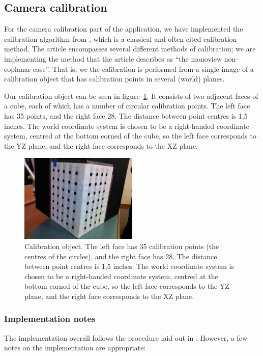 \subsection{Camera calibration}
For the camera calibration part of the application, we have
implemented the calibration algorithm from \cite{TSAI}, which is a
classical and often cited calibration method. The article encompasses
several different methods of calibration; we are implementing the
method that the article describes as ``the monoview non-coplanar
case''. That is, we the calibration is performed from a single image
of a calibration object that has calibration points in several (world)
planes.

Our calibration object can be seen in figure~\ref{fig:calib-object}.
It consists of two adjacent faces of a cube, each of which has a
number of circular calibration points. The left face has 35 points,
and the right face 28. The distance between point centres is 1,5
inches. The world coordinate system is chosen to be a right-handed
coordinate system, centred at the bottom corned of the cube, so the
left face corresponds to the YZ plane, and the right face corresponds
to the XZ plane.

\begin{figure}[HBO]
  \centering
  \includegraphics[width=0.5\textwidth]{figures/calibration-object}
  \caption{Calibration object. The left face has 35 calibration points
    (the centres of the circles), and the right face has 28. The
    distance between point centres is 1,5 inches. The world coordinate
    system is chosen to be a right-handed coordinate system, centred
    at the bottom corned of the cube, so the left face corresponds to
    the YZ plane, and the right face corresponds to the XZ plane.}
  \label{fig:calib-object}
\end{figure}

\subsubsection{Implementation notes}
The implementation overall follows the procedure laid out in
\cite{TSAI}. However, a few notes on the implementation are
appropriate:

